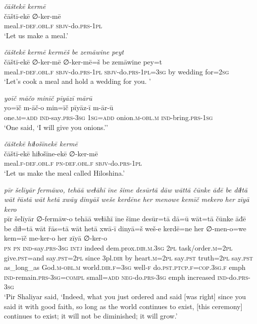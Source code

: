 \ea \label{ŽP.231}
\textit{čāštekē kermē} \\ 
\gll čāštī-ekē ∅-ker-mē \\ 
 meal\textsc{.f}\textsc{-def}\textsc{.obl}\textsc{.f} \textsc{sbjv-}do\textsc{.prs}\textsc{-1pl} \\ 
\glt `Let us make a meal.'
\z 
 
\ea \label{ŽP.232}
\textit{čāštekē kermē kermēš be zemāwine peyt} \\ 
\gll čāštī-ekē ∅-ker-mē ∅-ker-mē=š be zemāwine pey=t \\ 
 meal\textsc{.f}\textsc{-def}\textsc{.obl}\textsc{.f} \textsc{sbjv-}do\textsc{.prs}\textsc{-1pl} \textsc{sbjv-}do\textsc{.prs}\textsc{-1pl}\textsc{=3sg} by wedding for\textsc{=\textsc{2sg}} \\ 
\glt `Let’s cook a meal and hold a wedding for you. '
\z 
 
\ea \label{ŽP.240}
\textit{yoīč māčo minīč pīyāzī mārū} \\ 
\gll yo=īč m-āč-o min=īč pīyāz-ī m-ār-ū \\ 
 one\textsc{.m}\textsc{=add} \textsc{ind-}say\textsc{.prs}\textsc{-3sg} \textsc{1sg}\textsc{=add} onion\textsc{.m}\textsc{-obl}\textsc{.m} \textsc{ind-}bring\textsc{.prs}\textsc{-\textsc{1sg}} \\ 
\glt `One said, ‘I will give you onions.’'
\z 
 
\ea \label{ŽP.241}
\textit{čāštekē hiɫošīnekē kermē} \\ 
\gll čāštī-ekē hiɫošīne-ekē ∅-ker-mē \\ 
 meal\textsc{.f}\textsc{-def}\textsc{.obl}\textsc{.f} \textsc{pn}\textsc{-def}\textsc{.obl}\textsc{.f} \textsc{sbjv-}do\textsc{.prs}\textsc{-1pl} \\ 
\glt `Let us make the meal called Hiloshina.'
\z 
 
\ea \label{ŽP.243}
\textit{pīr šelīyār fermāwo, tehāā weɫāhī īne šime desūrtā dāw wāttā čūnke āđē be diɫtā wāt řāstā wāt hetā xwāy dinyāš weše kerdēne her menowe kemīč mekero her zīyā kero} \\ 
\gll pīr šelīyār ∅-fermāw-o tehāā weɫāhī īne šime desūr=tā dā=ū wāt=tā čūnke āđē be diɫ=tā wāt řās=tā wāt hetā xwā-ī dinyā=š weš-e kerdē=ne her ∅-men-o=we kem=īč me-ker-o her zīyā ∅-ker-o \\ 
 \textsc{pn} \textsc{pn} \textsc{ind-}say\textsc{.prs}\textsc{-3sg} \textsc{intj} indeed dem.prox\textsc{.dir}\textsc{.m}\textsc{.3sg} \textsc{2pl} task/order\textsc{.m}=\textsc{2pl} give\textsc{.pst}=and say\textsc{.pst}=\textsc{2pl} since 3pl\textsc{.dir} by heart\textsc{.m}=\textsc{2pl} say\textsc{.pst} truth=\textsc{2pl} say\textsc{.pst} as\_long\_as God\textsc{.m}\textsc{-obl}\textsc{.m} world\textsc{.dir}\textsc{.f}\textsc{=3sg} well\textsc{-f} do\textsc{.pst}\textsc{.ptcp}\textsc{.f}\textsc{=cop}\textsc{.3sg}\textsc{.f} emph \textsc{ind-}remain\textsc{.prs}\textsc{-3sg}\textsc{=compl} small\textsc{=add} \textsc{neg-}do\textsc{.prs}\textsc{-3sg} emph increased \textsc{ind-}do\textsc{.prs}\textsc{-3sg} \\ 
\glt `Pir Shaliyar said, ‘Indeed, what you just ordered and said [was right] since you said it with good faith, so long as the world continues to exist, [this ceremony] continues to exist; it will not be diminished; it will grow.'
\z 
 
